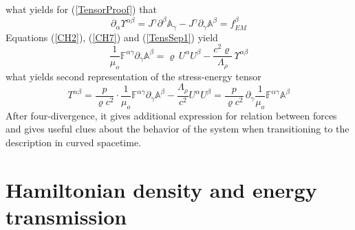 \documentclass[aps,prx,preprint,groupedaddress,showkeys]{revtex4-2}
\begin{document}
what yields for (\ref{TensorProof}) that
\begin{equation} \label{UpsFin}
\partial_{\alpha} \Upsilon^{\alpha \beta} = J^{\gamma} \partial^{\beta} \mathbb{A}_{\gamma} - J^{\gamma}\partial_{\gamma} \mathbb{A}^{\beta} = f_{EM}^{\beta}
\end{equation}
Equations (\ref{CH2}), (\ref{CH7}) and (\ref{TensSep1}) yield
\begin{equation} \label{TensSep2}
\frac{1}{\mu_o} \mathbb{F}^{\alpha \gamma} \partial_{\gamma} \mathbb{A}^{\beta} = \varrho \, U^{\alpha} U^{\beta} - \frac{c^2 \varrho }{\Lambda_{\rho}} \, \Upsilon^{\alpha \beta}
\end{equation}
what yields second representation of the stress-energy tensor
\begin{equation} \label{TensSep3}
T^{\alpha \beta} = \frac{p}{\varrho c^2} \cdot \frac{1}{\mu_o} \mathbb{F}^{\alpha \gamma} \partial_{\gamma} \mathbb{A}^{\beta} - \frac {\Lambda_{\rho}}{c^2} U^{\alpha} U^{\beta} = \frac{p}{\varrho c^2} \, \partial_{\gamma} \frac{1}{\mu_o} \mathbb{F}^{\alpha \gamma} \mathbb{A}^{\beta}
\end{equation}
After four-divergence, it gives additional expression for relation between forces and gives useful clues about the behavior of the system when transitioning to the description in curved spacetime.

\section{Hamiltonian density and energy transmission} \label{Hamilton}
\end{document}
